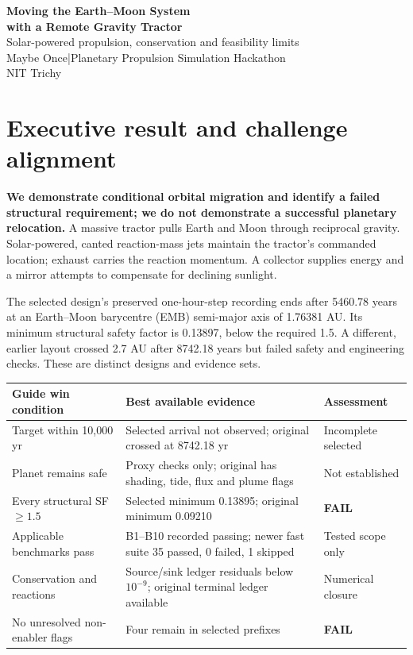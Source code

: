﻿\documentclass[10pt,a4paper]{article}
\newcommand{\status}[1]{\textbf{\textcolor{amber}{#1}}}
\newcommand{\team}{Maybe Once}
\begin{document}
\begin{center}
{\LARGE\bfseries Moving the Earth--Moon System\\with a Remote Gravity Tractor}\\[5pt]
{\large Solar-powered propulsion, conservation and feasibility limits}\\[5pt]
\team\quad |\quad Planetary Propulsion Simulation Hackathon\\
\small NIT Trichy
\end{center}
\section{Executive result and challenge alignment}
\textbf{We demonstrate conditional orbital migration and identify a failed structural requirement; we do not demonstrate a successful planetary relocation.} A massive tractor pulls Earth and Moon through reciprocal gravity. Solar-powered, canted reaction-mass jets maintain the tractor's commanded location; exhaust carries the reaction momentum. A collector supplies energy and a mirror attempts to compensate for declining sunlight.

The selected design's preserved one-hour-step recording ends after 5460.78 years at an Earth--Moon barycentre (EMB) semi-major axis of 1.76381 AU. Its minimum structural safety factor is 0.13897, below the required 1.5. A different, earlier layout crossed 2.7 AU after 8742.18 years but failed safety and engineering checks. These are distinct designs and evidence sets.

\par\smallskip
{\small\noindent\begin{tabularx}{\linewidth}{@{}L{33mm}X L{24mm}@{}}\toprule
Guide win condition & Best available evidence & Assessment\\\midrule
Target within 10,000 yr & Selected arrival not observed; original crossed at 8742.18 yr & Incomplete selected\\
Planet remains safe & Proxy checks only; original has shading, tide, flux and plume flags & Not established\\
Every structural SF $\ge1.5$ & Selected minimum 0.13895; original minimum 0.09210 & \status{FAIL}\\
Applicable benchmarks pass & B1--B10 recorded passing; newer fast suite 35 passed, 0 failed, 1 skipped & Tested scope only\\
Conservation and reactions & Source/sink ledger residuals below $10^{-9}$; original terminal ledger available & Numerical closure\\
No unresolved non-enabler flags & Four remain in selected prefixes & \status{FAIL}\\\bottomrule
\end{tabularx}\par}
\smallskip
\end{document}
